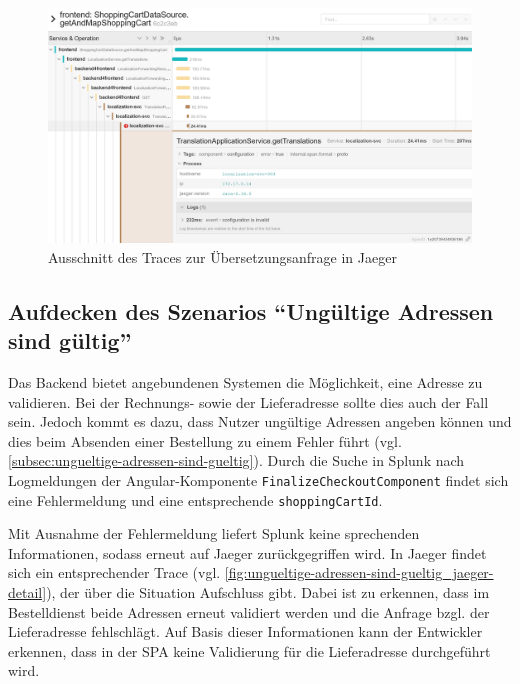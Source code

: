 \begin{figure}[H]
	\centering
	\includegraphics[width=1.00\linewidth]{img/05_ergebnis/keine-uebersetzungen_jaeger_detail.png}
	\caption{Ausschnitt des Traces zur Übersetzungsanfrage in Jaeger}
	\label{fig:keine-uebersetzungen_jaeger_detail}
\end{figure}

\subsection{Aufdecken des Szenarios \enquote{Ungültige Adressen sind gültig}}

Das Backend bietet angebundenen Systemen die Möglichkeit, eine Adresse zu validieren. Bei der Rechnungs- sowie der Lieferadresse sollte dies auch der Fall sein. Jedoch kommt es dazu, dass Nutzer ungültige Adressen angeben können und dies beim Absenden einer Bestellung zu einem Fehler führt (vgl. \autoref{subsec:ungueltige-adressen-sind-gueltig}). Durch die Suche in Splunk nach Logmeldungen der Angular-Komponente \texttt{Finalize\-Checkout\-Component} findet sich eine Fehlermeldung und eine entsprechende \texttt{shopping\-Cart\-Id}.

Mit Ausnahme der Fehlermeldung liefert Splunk keine sprechenden Informationen, sodass erneut auf Jaeger zurückgegriffen wird. In Jaeger findet sich ein entsprechender Trace (vgl. \autoref{fig:ungueltige-adressen-sind-gueltig_jaeger-detail}), der über die Situation Aufschluss gibt. Dabei ist zu erkennen, dass im Bestelldienst beide Adressen erneut validiert werden und die Anfrage bzgl. der Lieferadresse fehlschlägt. Auf Basis dieser Informationen kann der Entwickler erkennen, dass in der SPA keine Validierung für die Lieferadresse durchgeführt wird.

